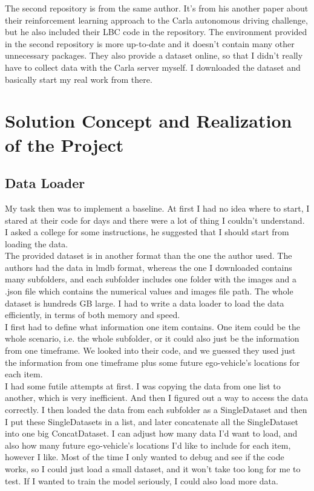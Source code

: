 \documentclass[inputenc=utf8]{ldvarticle}
\begin{document}
\noindent The second repository is from the same author. It’s from his another paper about their reinforcement learning approach to the Carla autonomous driving challenge, but he also included their LBC code in the repository. The environment provided in the second repository is more up-to-date and it doesn’t contain many other unnecessary packages. They also provide a dataset online, so that I didn’t really have to collect data with the Carla server myself. I downloaded the dataset and basically start my real work from there.

\section{Solution Concept and Realization of the Project}

\subsection{Data Loader}
My task then was to implement a baseline. At first I had no idea where to start, I stared at their code for days and there were a lot of thing I couldn’t understand. I asked a college for some instructions, he suggested that I should start from loading the data.
\\

\noindent The provided dataset is in another format than the one the author used. The authors had the data in lmdb format, whereas the one I downloaded contains many subfolders, and each subfolder includes one folder with the images and a .json file which contains the numerical values and images file path. The whole dataset is hundreds GB large. I had to write a data loader to load the data efficiently, in terms of both memory and speed.
\\

\noindent I first had to define what information one item contains. One item could be the whole scenario, i.e. the whole subfolder, or it could also just be the information from one timeframe. We looked into their code, and we guessed they used just the information from one timeframe plus some future ego-vehicle’s locations for each item.
\\

\noindent I had some futile attempts at first. I was copying the data from one list to another, which is very inefficient. And then I figured out a way to access the data correctly. I then loaded the data from each subfolder as a SingleDataset and then I put these SingleDatasets in a list, and later concatenate all the SingleDataset into one big ConcatDataset. I can adjust how many data I’d want to load, and also how many future ego-vehicle’s locations I’d like to include for each item, however I like. Most of the time I only wanted to debug and see if the code works, so I could just load a small dataset, and it won’t take too long for me to test. If I wanted to train the model seriously, I could also load more data.
\\
\end{document}
